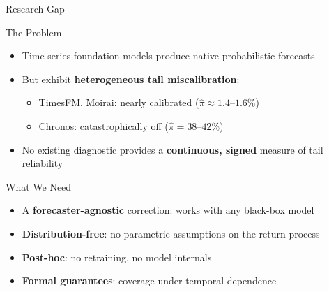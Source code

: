 \documentclass[9pt, aspectratio=169, t]{beamer}
\begin{document}
\begin{frame}{Research Gap}
	\vspace{-0.2cm}
	{\small
	\begin{alertblock}{The Problem}
		\begin{itemize}\setlength{\itemsep}{2pt}
			\item Time series foundation models produce native probabilistic forecasts
			\item But exhibit \textbf{heterogeneous tail miscalibration}:
			\begin{itemize}
				\item TimesFM, Moirai: nearly calibrated ($\hat\pi \approx 1.4$--$1.6\%$)
				\item Chronos: catastrophically off ($\hat\pi = 38$--$42\%$)
			\end{itemize}
			\item No existing diagnostic provides a \textbf{continuous, signed} measure of tail reliability
		\end{itemize}
	\end{alertblock}
	\vspace{2mm}
	\begin{block}{What We Need}
		\begin{itemize}\setlength{\itemsep}{2pt}
			\item A \textbf{forecaster-agnostic} correction: works with any black-box model
			\item \textbf{Distribution-free}: no parametric assumptions on the return process
			\item \textbf{Post-hoc}: no retraining, no model internals
			\item \textbf{Formal guarantees}: coverage under temporal dependence
		\end{itemize}
	\end{block}
	}
\end{frame}
\end{document}
